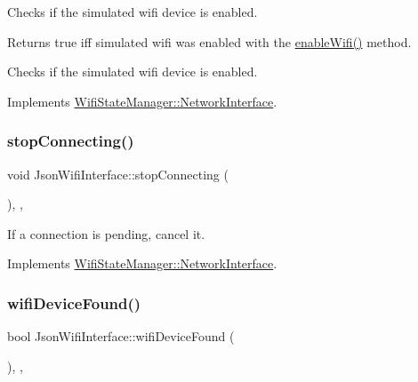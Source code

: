 Checks if the simulated wifi device is enabled.

\begin{DoxyReturn}{Returns}
true iff simulated wifi was enabled with the \mbox{\hyperlink{classJsonWifiInterface_ac87e53c922fb19cf684d94d174aa6274}{enable\+Wifi()}} method.
\end{DoxyReturn}
Checks if the simulated wifi device is enabled. 

Implements \mbox{\hyperlink{classWifiStateManager_1_1NetworkInterface_aefcafd5baac9715524c60d65b0f523ce}{Wifi\+State\+Manager\+::\+Network\+Interface}}.

\mbox{\label{classJsonWifiInterface_abb186f1293c4f5b7c28dfb2b86f8c95a}} 
\subsubsection{\texorpdfstring{stop\+Connecting()}{stopConnecting()}}
{\footnotesize\ttfamily void Json\+Wifi\+Interface\+::stop\+Connecting (\begin{DoxyParamCaption}{ }\end{DoxyParamCaption})\hspace{0.3cm}{\ttfamily [override]}, {\ttfamily [protected]}, {\ttfamily [virtual]}}

If a connection is pending, cancel it. 

Implements \mbox{\hyperlink{classWifiStateManager_1_1NetworkInterface_a201033fbed61d18311773c3035806fc0}{Wifi\+State\+Manager\+::\+Network\+Interface}}.

\mbox{\label{classJsonWifiInterface_ae8f08870a543214555113d103e9fc136}} 
\subsubsection{\texorpdfstring{wifi\+Device\+Found()}{wifiDeviceFound()}}
{\footnotesize\ttfamily bool Json\+Wifi\+Interface\+::wifi\+Device\+Found (\begin{DoxyParamCaption}{ }\end{DoxyParamCaption})\hspace{0.3cm}{\ttfamily [override]}, {\ttfamily [protected]}, {\ttfamily [virtual]}}

